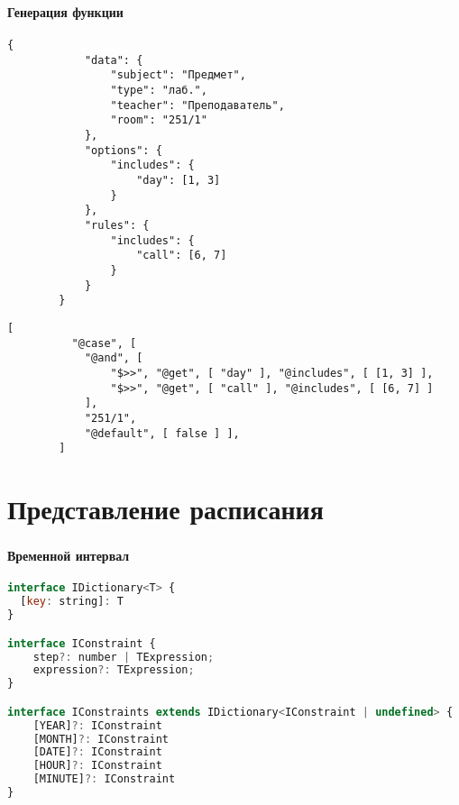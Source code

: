 \begin{frame}[fragile]
\frametitle{\insertsection}
\framesubtitle{Генерация функции}
    \begin{lstlisting}[basicstyle=\tiny]
        {
            "data": {
                "subject": "Предмет",
                "type": "лаб.",
                "teacher": "Преподаватель",
                "room": "251/1"
            },
            "options": {
                "includes": {
                    "day": [1, 3]
                }
            },
            "rules": {
                "includes": {
                    "call": [6, 7]
                }
            }
        }
    \end{lstlisting}
\endminipage\hfill
{}
    \begin{lstlisting}[basicstyle=\tiny]
        [
          "@case", [
            "@and", [
                "$>>", "@get", [ "day" ], "@includes", [ [1, 3] ],
                "$>>", "@get", [ "call" ], "@includes", [ [6, 7] ]
            ],
            "251/1",
            "@default", [ false ] ],
        ]
    \end{lstlisting}
\endminipage

\end{frame}


\section{Представление расписания}

\begin{frame}[fragile]
\frametitle{\insertsection}
\framesubtitle{Временной интервал}

\begin{lstlisting}[basicstyle=\tiny, language=js]
interface IDictionary<T> {
  [key: string]: T
}

interface IConstraint {
    step?: number | TExpression;
    expression?: TExpression;
}

interface IConstraints extends IDictionary<IConstraint | undefined> {
    [YEAR]?: IConstraint
    [MONTH]?: IConstraint
    [DATE]?: IConstraint
    [HOUR]?: IConstraint
    [MINUTE]?: IConstraint
}
\end{lstlisting}
\end{frame}


